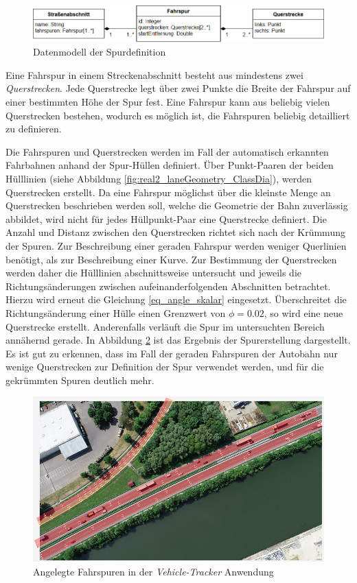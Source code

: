 \begin{figure}[H]
    \centering
    \includegraphics[align=c, width=0.85\linewidth]{resources/img/umsetzung/U2/Fahrspurmodell}
    \caption{Datenmodell der Spurdefinition}
    \label{fig:real2_lane_datamodell}
\end{figure}

Eine Fahrspur in einem Streckenabschnitt besteht aus mindestens zwei \textit{Querstrecken}. Jede Querstrecke
legt über zwei Punkte die Breite der Fahrspur auf einer bestimmten Höhe der Spur fest. Eine Fahrspur
kann aus beliebig vielen Querstrecken bestehen, wodurch es möglich ist, die Fahrspuren beliebig detailliert
zu definieren.

Die Fahrspuren und Querstrecken werden im Fall der automatisch erkannten Fahrbahnen anhand der Spur-Hüllen
definiert. Über Punkt-Paaren der beiden Hülllinien (siehe Abbildung \ref{fig:real2_laneGeometry_ClassDia}),
werden Querstrecken erstellt.
Da eine Fahrspur möglichst über die kleinste Menge an Querstrecken beschrieben werden soll, welche die
Geometrie der Bahn zuverlässig abbildet, wird nicht für jedes Hüllpunkt-Paar eine Querstrecke definiert.
Die Anzahl und Distanz zwischen den Querstrecken richtet sich nach der Krümmung der Spuren. Zur Beschreibung
einer geraden Fahrspur werden weniger Querlinien benötigt, als zur Beschreibung einer Kurve.
Zur Bestimmung der Querstrecken werden daher die Hülllinien abschnittsweise untersucht und jeweils
die Richtungsänderungen zwischen aufeinanderfolgenden Abschnitten betrachtet. Hierzu wird erneut
die Gleichung \ref{eq_angle_skalar} eingesetzt.
Überschreitet die Richtungsänderung einer Hülle einen Grenzwert von $\phi = 0.02$, so wird eine neue
Querstrecke erstellt. Anderenfalls verläuft die Spur im untersuchten Bereich annähernd gerade.
In Abbildung \ref{fig:real2_lanes_trackerApplication} ist das Ergebnis der Spurerstellung dargestellt.
Es ist gut zu erkennen, dass im Fall der geraden Fahrspuren der Autobahn nur wenige Querstrecken zur
Definition der Spur verwendet werden, und für die gekrümmten Spuren deutlich mehr.

\begin{figure}[H]
    \centering
    \includegraphics[align=c, width=0.6\linewidth]{resources/img/umsetzung/U2/LaneCreator_Example}
    \caption{Angelegte Fahrspuren in der \textit{Vehicle-Tracker} Anwendung}
    \label{fig:real2_lanes_trackerApplication}
\end{figure}


